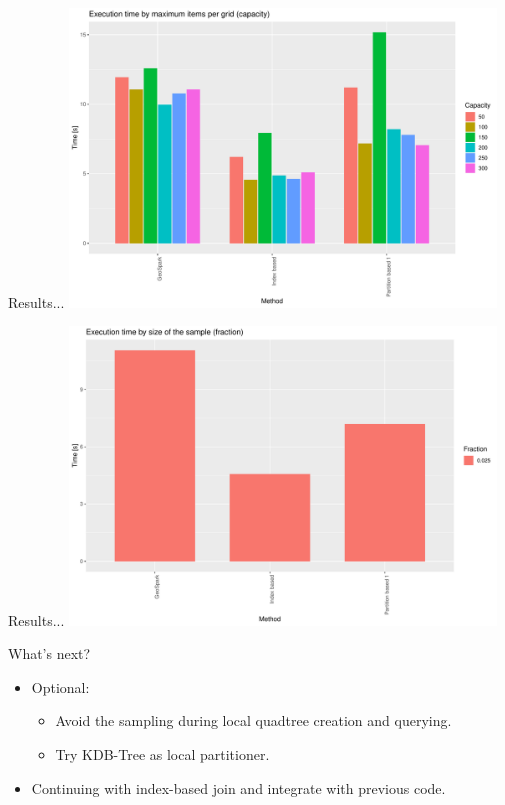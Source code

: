 \documentclass{beamer}
\begin{document}
\begin{frame}{Results...}
    \centering
    \includegraphics[width=0.85\textwidth]{figures/ByCapacity}
\end{frame}

\begin{frame}{Results...}
    \centering
    \includegraphics[width=0.85\textwidth]{figures/ByFraction}
\end{frame}

\begin{frame}{What's next?}
    \begin{itemize}
        \item Optional:
        \begin{itemize}
            \item Avoid the sampling during local quadtree creation and querying.  
            \item Try KDB-Tree as local partitioner.
        \end{itemize}
        \item Continuing with index-based join and integrate with previous code.
    \end{itemize}
\end{frame}
\end{document}
